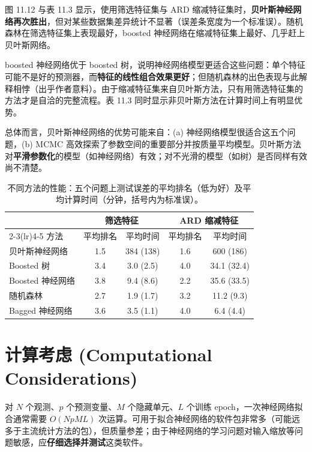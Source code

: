 \begin{remark}[结果]
图 11.12 与表 11.3 显示，使用筛选特征集与 ARD 缩减特征集时，\textbf{贝叶斯神经网络再次胜出}，但对某些数据集差异统计不显著（误差条宽度为一个标准误）。随机森林在筛选特征集上表现最好，boosted 神经网络在缩减特征集上最好、几乎赶上贝叶斯网络。

boosted 神经网络优于 boosted 树，说明神经网络模型更适合这些问题：单个特征可能不是好的预测器，而\textbf{特征的线性组合效果更好}；但随机森林的出色表现与此解释相悖（出乎作者意料）。由于缩减特征集来自贝叶斯方法，只有用筛选特征集的方法才是自洽的完整流程。表 11.3 同时显示非贝叶斯方法在计算时间上有明显优势。

总体而言，贝叶斯神经网络的优势可能来自：(a) 神经网络模型很适合这五个问题，(b) MCMC 高效探索了参数空间的重要部分并按质量平均模型。贝叶斯方法对\textbf{平滑参数化}的模型（如神经网络）有效；对不光滑的模型（如树）是否同样有效尚不清楚。
\end{remark}

\begin{table}[htbp]
\centering
\caption{不同方法的性能：五个问题上测试误差的平均排名（低为好）及平均计算时间（分钟，括号内为标准误）。}
\label{tab:11_3}
\begin{tabular}{lcccc}
\toprule
& \multicolumn{2}{c}{筛选特征} & \multicolumn{2}{c}{ARD 缩减特征} \\
\cmidrule(lr){2-3}\cmidrule(lr){4-5}
方法 & 平均排名 & 平均时间 & 平均排名 & 平均时间 \\
\midrule
贝叶斯神经网络 & 1.5 & 384 (138) & 1.6 & 600 (186) \\
Boosted 树 & 3.4 & 3.0 (2.5) & 4.0 & 34.1 (32.4) \\
Boosted 神经网络 & 3.8 & 9.4 (8.6) & 2.2 & 35.6 (33.5) \\
随机森林 & 2.7 & 1.9 (1.7) & 3.2 & 11.2 (9.3) \\
Bagged 神经网络 & 3.6 & 3.5 (1.1) & 4.0 & 6.4 (4.4) \\
\bottomrule
\end{tabular}
\end{table}

\section{计算考虑 (Computational Considerations)}

对 $N$ 个观测、$p$ 个预测变量、$M$ 个隐藏单元、$L$ 个训练 epoch，一次神经网络拟合通常需要 $O(NpML)$ 次运算。可用于拟合神经网络的软件包非常多（可能远多于主流统计方法的包），但质量参差；由于神经网络的学习问题对输入缩放等问题敏感，应\textbf{仔细选择并测试}这类软件。


